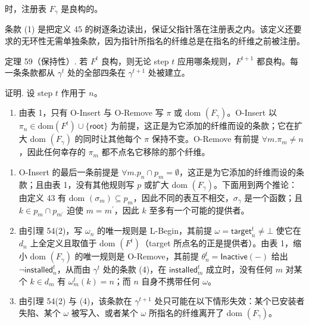 \documentclass[
  10
]{article}
\providecommand{\tightlist}{%
  \setlength{\itemsep}{0pt}\setlength{\parskip}{0pt}}
\begin{document}
时，注册表 $F _ { \gamma }$ 是良构的。

条款 (1) 是把定义 45 的树逐条边读出，保证父指针落在注册表之内。该定义还要求的无环性无需单独条款，因为指针所指名的纤维总是在指名的纤维之前被注册。

定理 59（保持性）. 若 $F ^ { t }$ 良构，则无论 step $t$ 应用哪条规则，$F ^ { t + 1 }$ 都良构。每一条条款都从 $\gamma ^ { t }$ 处的全部四条在 $\gamma ^ { t + 1 }$ 处被建立。

证明. 设 step $t$ 作用于 $n$。

\begin{enumerate}
\def\labelenumi{(\arabic{enumi})}
\tightlist
\item
  由表 1，只有 O-Insert 与 O-Remove 写 $\pi$ 或 dom $\left( F _ { \gamma } \right)$。O-Insert 以 $\pi _ { n } \in \mathrm { d o m } ( F ^ { t } ) \cup \{ \mathsf{root} \}$ 为前提，这正是为它添加的纤维而设的条款；它在扩大 dom $\left( F _ { \gamma } \right)$ 的同时让其他每个 $\pi$ 保持不变。O-Remove 有前提 $\forall m. \pi _ { m } \neq n$，因此任何幸存的 $\pi _ { m }$ 都不点名它移除的那个纤维。
\end{enumerate}

\begin{enumerate}
\def\labelenumi{(\arabic{enumi})}
\setcounter{enumi}{1}
\item
  O-Insert 的最后一条前提是 $\forall m. p _ { n } \cap p _ { m } = \emptyset$，这正是为它添加的纤维而设的条款；且由表 1，没有其他规则写 $p$ 或扩大 dom $\left( F _ { \gamma } \right)$。下面用到两个推论：由定义 43 有 dom $( \sigma _ { m } ) \subseteq p _ { m }$，因此不同的表互不相交，$\sigma _ { \gamma }$ 是一个函数；且 $k \in p _ { m } \cap p _ { m ^ { \prime } }$ 迫使 $m = m ^ { \prime }$，因此 $k$ 至多有一个可能的提供者。
\item
  由引理 54(2)，写 $\omega _ { n }$ 的唯一规则是 L-Begin，其前提 $\omega = \mathsf { t a r g e t } _ { n } ^ { t } \neq \bot$ 使它在 $d _ { n }$ 上全定义且取值于 dom $\left( F ^ { t } \right)$（target 所点名的正是提供者）。由表 1，缩小 dom $\left( F _ { \gamma } \right)$ 的唯一规则是 O-Remove，其前提 $\theta _ { n } ^ { t } = \mathsf { I n a c t i v e } ( - )$ 给出 $\neg \mathsf { i n s t a l l e d } _ { n } ^ { t }$，从而由 $\gamma ^ { t }$ 处的条款 (4)，在 $\mathsf { i n s t a l l e d } _ { m } ^ { t }$ 成立时，没有任何 $m$ 对某个 $k \in d _ { m }$ 有 $\omega _ { m } ^ { t } ( k ) = n$；而 $n$ 自身不携带任何 $\omega$。
\item
  由引理 54(2) 与 (4)，该条款在 $\gamma ^ { t + 1 }$ 处只可能在以下情形失效：某个已安装者失陷、某个 $\omega$ 被写入、或者某个 $\omega$ 所指名的纤维离开了 dom $\left( F _ { \gamma } \right)$。
\end{enumerate}
\end{document}
